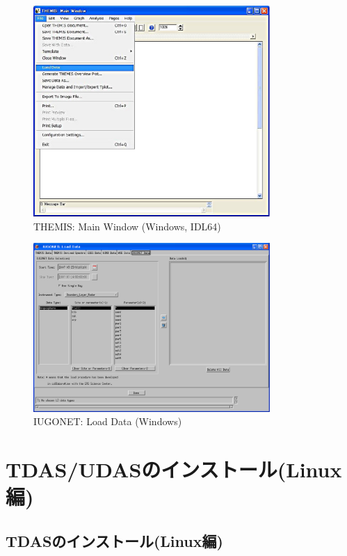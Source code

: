 \documentclass[a4j]{jbook}
\begin{document}
\begin{figure}[H]
\begin{center}
\includegraphics[width=9cm]{images/fig_idl64/Fig8.eps}
\caption{THEMIS: Main Window (Windows, IDL64)}
\label{idl64/Fig8.eps}
\end{center}
\end{figure}

\begin{figure}[H]
\begin{center}
\includegraphics[width=9cm]{images/thm_gui_windows2.eps}
\caption{IUGONET: Load Data (Windows)}
\label{thm_gui_windows2.eps}
\end{center}
\end{figure}

\part{TDAS/UDASのインストール(Linux編)}

\chapter{TDASのインストール(Linux編)}
\label{tdas_install_linux}
\end{document}
